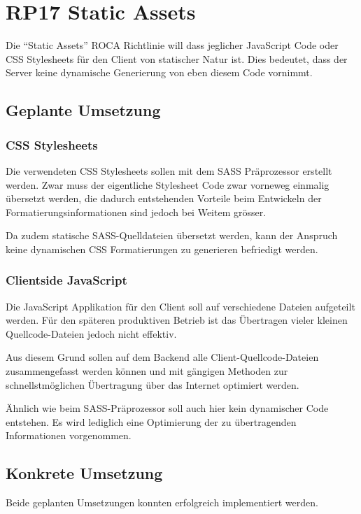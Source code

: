 \section{RP17 Static Assets}
\label{sec:principle-rp17-static-assets}

Die ``Static Assets'' ROCA Richtlinie will dass jeglicher JavaScript Code oder CSS Stylesheets für den Client von statischer Natur ist. Dies bedeutet, dass der Server keine dynamische Generierung von eben diesem Code vornimmt.

\subsection*{Geplante Umsetzung}
\subsubsection*{CSS Stylesheets}
Die verwendeten CSS Stylesheets sollen mit dem SASS Präprozessor \cite{SASS} erstellt werden. Zwar muss der eigentliche Stylesheet Code zwar vorneweg einmalig übersetzt werden, die dadurch entstehenden Vorteile beim Entwickeln der Formatierungsinformationen sind jedoch bei Weitem grösser.

Da zudem statische SASS-Quelldateien übersetzt werden, kann der Anspruch keine dynamischen CSS Formatierungen zu generieren befriedigt werden.

\subsubsection*{Clientside JavaScript}
Die JavaScript Applikation für den Client soll auf verschiedene Dateien aufgeteilt werden. Für den späteren produktiven Betrieb ist das Übertragen vieler kleinen Quellcode-Dateien jedoch nicht effektiv.

Aus diesem Grund sollen auf dem Backend alle Client-Quellcode-Dateien zusammengefasst werden können und mit gängigen Methoden zur schnellstmöglichen Übertragung über das Internet optimiert werden.

Ähnlich wie beim SASS-Präprozessor soll auch hier kein dynamischer Code entstehen. Es wird lediglich eine Optimierung der zu übertragenden Informationen vorgenommen.


\subsection*{Konkrete Umsetzung}
Beide geplanten Umsetzungen konnten erfolgreich implementiert werden.

